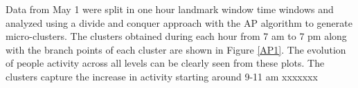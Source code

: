 \documentclass[../UNBThesis2.tex]{subfiles}
\begin{document}
Data from May 1 were split in one hour landmark window time windows and analyzed using a divide and conquer approach with the AP algorithm to generate micro-clusters. The clusters obtained during each hour from 7 am to 7 pm along with the branch points of each cluster are shown in Figure \ref{AP1}. The evolution of people activity across all levels can be clearly seen from these plots. The clusters capture the increase in activity starting around 9-11 am xxxxxxx
\end{document}
